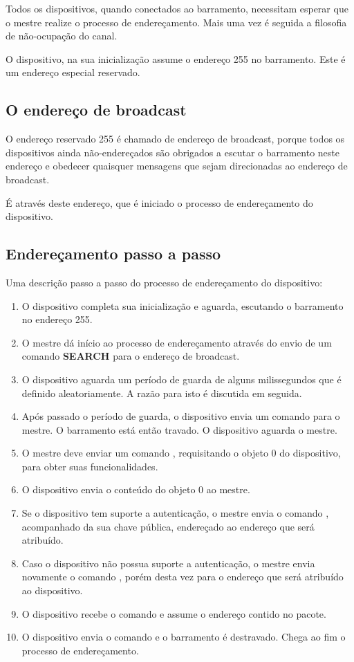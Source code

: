 \documentclass[11pt]{report}
\begin{document}
Todos os dispositivos, quando conectados ao barramento, necessitam esperar que o mestre realize o processo de endereçamento. Mais uma vez é seguida a filosofia de não-ocupação do canal.

O dispositivo, na sua inicialização assume o endereço 255 no barramento. Este é um endereço especial reservado.

\subsection{O endereço de broadcast}

O endereço reservado 255 é chamado de endereço de broadcast, porque todos os dispositivos ainda não-endereçados são obrigados a escutar o barramento neste endereço e obedecer quaisquer mensagens que sejam direcionadas ao endereço de broadcast.

É através deste endereço, que é iniciado o processo de endereçamento do dispositivo.

\subsection{Endereçamento passo a passo}

Uma descrição passo a passo do processo de endereçamento do dispositivo:

\begin{enumerate}

\item O dispositivo completa sua inicialização e aguarda, escutando o barramento no endereço 255.
\item O mestre dá início ao processo de endereçamento através do envio de um comando \textbf{SEARCH} para o endereço de broadcast.
\item O dispositivo aguarda um período de guarda de alguns milissegundos que é definido aleatoriamente. A razão para isto é discutida em seguida.
\item Após passado o período de guarda, o dispositivo envia um comando  para o mestre. O barramento está então travado. O dispositivo aguarda o mestre.
\item O mestre deve enviar um comando , requisitando o objeto 0 do dispositivo, para obter suas funcionalidades.
\item O dispositivo envia o conteúdo do objeto 0 ao mestre.
\item Se o dispositivo tem suporte a autenticação, o mestre envia o comando , acompanhado da sua chave pública, endereçado ao endereço que será atribuído.
\item Caso o dispositivo não possua suporte a autenticação, o mestre envia novamente o comando , porém desta vez para o endereço que será atribuído ao dispositivo.
\item O dispositivo recebe o comando e assume o endereço contido no pacote.
\item O dispositivo envia o comando  e o barramento é destravado. Chega ao fim o processo de endereçamento.

\end{enumerate}
\end{document}

